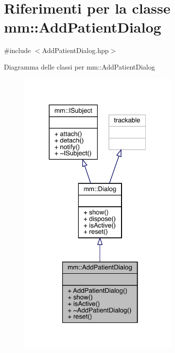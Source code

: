 \hypertarget{classmm_1_1_add_patient_dialog}{}\section{Riferimenti per la classe mm\+:\+:Add\+Patient\+Dialog}
\label{classmm_1_1_add_patient_dialog}


{\ttfamily \#include $<$Add\+Patient\+Dialog.\+hpp$>$}



Diagramma delle classi per mm\+:\+:Add\+Patient\+Dialog\nopagebreak
\begin{figure}[H]
\begin{center}
\leavevmode
\includegraphics[width=228pt]{d7/d63/classmm_1_1_add_patient_dialog__inherit__graph}
\end{center}
\end{figure}


